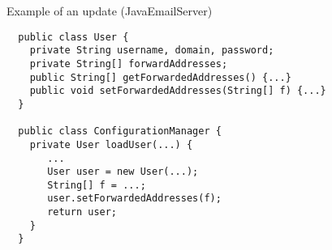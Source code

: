 \newcommand{\ExampleCodeSize}{footnotesize}
\begin{frame}[fragile,shrink=5]{Example of an update (JavaEmailServer)}%
\begin{\ExampleCodeSize}
\begin{verbatim}
  public class User {
    private String username, domain, password;
    private String[] forwardAddresses;
    public String[] getForwardedAddresses() {...}
    public void setForwardedAddresses(String[] f) {...}
  }

  public class ConfigurationManager {
    private User loadUser(...) {
       ...
       User user = new User(...);
       String[] f = ...;
       user.setForwardedAddresses(f);
       return user;
    }
  }




\end{verbatim}
\end{\ExampleCodeSize}
\end{frame}

% 
% 

